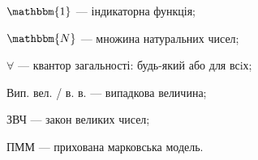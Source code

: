 $\mathbbm{1}$ --- індикаторна функція;

$\mathbbm{N}$ --- множина натуральних чисел;

$\forall$ --- квантор загальності: будь-який або для всiх;

Вип. вел. / в. в. --- випадкова величина;

ЗВЧ --- закон великих чисел;

ПММ --- прихована марковська модель.